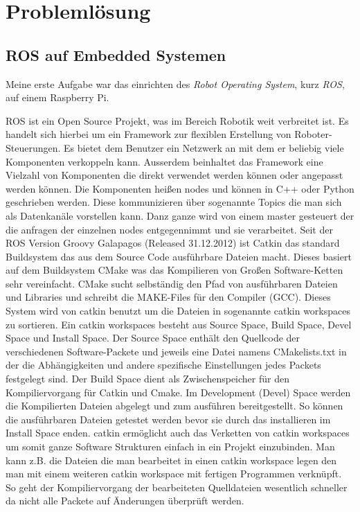 \chapter{Problemlösung}
\section{ROS auf Embedded Systemen}
Meine erste Aufgabe war das einrichten des \emph{Robot Operating System}, kurz \emph{ROS}, auf einem Raspberry Pi.

ROS ist ein Open Source Projekt, was im Bereich Robotik weit verbreitet ist.
Es handelt sich hierbei um ein Framework zur flexiblen Erstellung von Roboter-Steuerungen. Es bietet dem Benutzer ein Netzwerk an mit dem er beliebig viele Komponenten verkoppeln kann. Ausserdem beinhaltet das Framework eine Vielzahl von Komponenten die direkt verwendet werden können oder angepasst werden können.
Die Komponenten heißen \Glspl{node} und können in C++ oder Python geschrieben werden. Diese kommunizieren über sogenannte Topics die man sich als Datenkanäle vorstellen kann. Danz ganze wird von einem \Gls{master} gesteuert der die anfragen der einzelnen \Glspl{node} entgegennimmt und sie verarbeitet. 
Seit der ROS Version Groovy Galapagos (Released 31.12.2012) ist Catkin das standard Buildsystem das aus dem Source Code ausführbare Dateien macht. Dieses basiert auf dem Buildsystem CMake was das Kompilieren von Großen Software-Ketten sehr vereinfacht. CMake sucht selbständig den Pfad von ausführbaren Dateien und Libraries und schreibt die MAKE-Files für den Compiler (GCC). Dieses System wird von \Gls{catkin} benutzt um die Dateien in sogenannte \Glspl{catkin workspace} zu sortieren. Ein \Glspl{catkin workspace} besteht aus Source Space, Build Space, Devel Space und Install Space.
Der Source Space enthält den Quellcode der verschiedenen Software-Packete und jeweils eine Datei namens CMakelists.txt in der die Abhängigkeiten und andere spezifische Einstellungen jedes Packets festgelegt sind. 
Der Build Space dient als Zwischenspeicher für den Kompiliervorgang für Catkin und Cmake.
Im Development (Devel) Space werden die Kompilierten Dateien abgelegt und zum ausführen bereitgestellt. So können die ausführbaren Dateien getestet werden bevor sie durch das installieren im Install Space enden.
\Gls{catkin} ermöglicht auch das Verketten von \Glspl{catkin workspace} um somit ganze Software Strukturen einfach in ein Projekt einzubinden. Man kann z.B. die Dateien die man bearbeitet in einen \Gls{catkin workspace} legen den man mit einem weiteren \Gls{catkin workspace} mit fertigen Programmen verknüpft. So geht der Kompiliervorgang der bearbeiteten Quelldateien wesentlich schneller da nicht alle Packete auf Änderungen überprüft werden.

